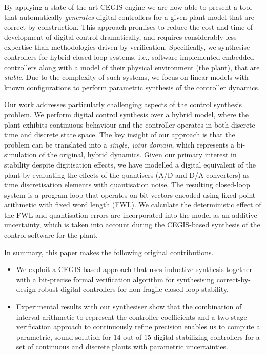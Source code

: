 \documentclass{sig-alternate-05-2015}
\begin{document}
By applying a state-of-the-art CEGIS engine we are now able to present a
tool that automatically \emph{generates} digital controllers for a given
plant model that are correct by construction.  This approach promises to
reduce the cost and time of development of digital control dramatically, and
requires considerably less expertise than methodologies driven by
verification.  Specifically, we synthesise controllers for hybrid
closed-loop systems, i.e., software-implemented embedded controllers along
with a model of their physical environment (the plant), that are
\emph{stable}.  Due to the complexity of such systems, we focus on linear
models with known configurations to perform parametric synthesis of the
controller dynamics.

Our work addresses particularly challenging aspects of the control synthesis
problem.  We perform digital control synthesis over a hybrid model, where
the plant exhibits continuous behaviour and the controller operates in both
discrete time and discrete state space.  The key insight of our approach is
that the problem can be translated into a \emph{single, joint domain}, which
represents a bi-simulation of the original, hybrid dynamics.  Given our
primary interest in stability despite digitisation effects, we have modelled
a digital equivalent of the plant by evaluating the effects of the
quantisers (A/D and D/A converters) as time discretisation elements with
quantisation noise.  The resulting closed-loop system is a program loop that
operates on bit-vectors encoded using fixed-point arithmetic with fixed word
length (FWL).  We calculate the deterministic effect of the FWL and
quantisation errors are incorporated into the model as an additive
uncertainty, which is taken into account during the CEGIS-based synthesis of
the control software for the plant.

In summary, this paper makes the following original contributions.
%
\begin{itemize}

\item We exploit a CEGIS-based approach that uses inductive synthesis
together with a bit-precise formal verification algorithm for synthesising
correct-by-design robust digital controllers for non-fragile closed-loop
stability.

\item Experimental results with our synthesiser show that the
combination of interval arithmetic to represent the controller coefficients
and a two-stage verification approach to continuously refine precision
enables us to compute a parametric, sound solution for $14$ out of $15$
digital stabilizing controllers for a set of continuous and discrete plants
with parametric uncertainties.

\end{itemize}
\end{document}

